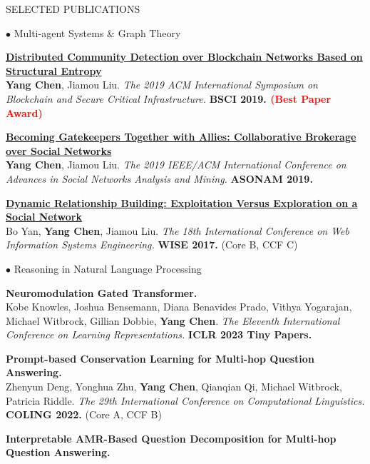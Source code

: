 \documentclass{resume} %
\begin{document}
\begin{rSection}{SELECTED PUBLICATIONS}
\begin{rSubsection}{\large $\bullet$ Multi-agent Systems \& Graph Theory}{}{}{}
\item {\href{https://www.researchgate.net/profile/Yang-Chen-67/publication/334358789_Distributed_Community_Detection_over_Blockchain_Networks_Based_on_Structural_Entropy/links/5d281b20299bf1547cadb905/Distributed-Community-Detection-over-Blockchain-Networks-Based-on-Structural-Entropy.pdf}{\bf Distributed Community Detection over Blockchain Networks Based on Structural Entropy}}\\
		\textbf{Yang Chen}, Jiamou Liu. {\em The 2019 ACM International Symposium on Blockchain and Secure Critical Infrastructure.} \textbf{BSCI 2019. \textcolor{red}{(Best Paper Award)}}\\
	\item {\href{https://github.com/PolynomialTime/ASONAM2019/blob/master/asonam2019.pdf}{\bf Becoming Gatekeepers Together with Allies: Collaborative Brokerage over Social Networks}}\\
		\textbf{Yang Chen}, Jiamou Liu. {\em The 2019 IEEE/ACM International Conference on Advances in Social Networks Analysis and Mining.} \textbf{ASONAM 2019.}\\
	\item {\href{https://github.com/PolynomialTime/WISE2017/blob/master/WISE2017.pdf}{\bf Dynamic Relationship Building: Exploitation Versus Exploration on a Social Network}}\\
		Bo Yan, \textbf{Yang Chen}, Jiamou Liu. {\em The 18th International Conference on Web Information Systems Engineering.} \textbf{WISE 2017.} (Core B, CCF C)\\
\end{rSubsection}
\begin{rSubsection}{\large $\bullet$ Reasoning in Natural Language Processing}{}{}{}
\item {\bf Neuromodulation Gated Transformer.}\\
Kobe Knowles, Joshua Bensemann, Diana Benavides Prado, Vithya Yogarajan, Michael Witbrock, Gillian Dobbie, \textbf{Yang Chen}. {\em The Eleventh International Conference on Learning Representations.} {\bf ICLR 2023 Tiny Papers.}\\
\item {\bf Prompt-based Conservation  Learning for Multi-hop Question Answering.}\\
Zhenyun Deng, Yonghua Zhu, \textbf{Yang Chen}, Qianqian Qi, Michael Witbrock, Patricia Riddle. {\em The 29th International Conference on Computational Linguistics.} \textbf{COLING 2022.} (Core A, CCF B)\\
\item {\bf Interpretable AMR-Based Question Decomposition for Multi-hop Question Answering.}\\

\end{rSubsection}
\end{rSection}
\end{document}
